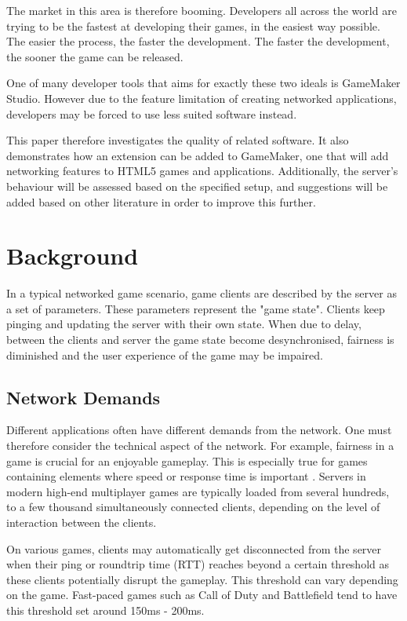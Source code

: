 \documentclass[bsc,frontabs,twoside,singlespacing,parskip,deptreport]{infthesis}     %
\begin{document}
The market in this area is therefore booming. Developers all across the world are trying to be the fastest at developing their games, in the easiest way possible. The easier the process, the faster the development. The faster the development, the sooner the game can be released.

One of many developer tools that aims for exactly these two ideals is GameMaker Studio. However due to the feature limitation of creating networked applications, developers may be forced to use less suited software instead. 

This paper therefore investigates the quality of related software. It also demonstrates how an extension can be added to GameMaker, one that will add networking features to HTML5 games and applications. Additionally, the server's behaviour will be assessed based on the specified setup, and suggestions will be added based on other literature in order to improve this further.

\chapter{Background}
In a typical networked game scenario, game clients are described by the server as a set of parameters. These parameters represent the "game state". Clients keep pinging and updating the server with their own state. When due to delay, between the clients and server the game state become desynchronised, fairness is diminished \cite{Fairness_and_Playability} and the user experience of the game may be impaired.

\section{Network Demands}
Different applications often have different demands from the network. One must therefore consider the technical aspect of the network. For example, fairness in a game is crucial for an enjoyable gameplay. This is especially true for games containing elements where speed or response time is important \cite{Fairness_and_Playability}. Servers in modern high-end multiplayer games are typically loaded from several hundreds, to a few thousand simultaneously connected clients, depending on the level of interaction between the clients.

On various games, clients may automatically get disconnected from the server when their ping or roundtrip time (RTT) reaches beyond a certain threshold as these clients potentially disrupt the gameplay. This threshold can vary depending on the game. Fast-paced games such as Call of Duty and Battlefield tend to have this threshold set around 150ms - 200ms.
\end{document}
